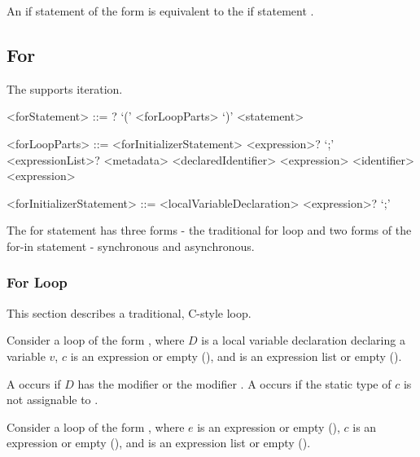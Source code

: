 \documentclass[makeidx]{article}
\begin{document}
{\LMHash{}%
An if statement of the form  is equivalent to
the if statement .


\subsection{For}

\LMHash{}%
The  supports iteration.

\begin{grammar}
<forStatement> ::= \AWAIT? \FOR{} `(' <forLoopParts> `)' <statement>

<forLoopParts> ::= <forInitializerStatement> <expression>? `;' <expressionList>?
  \alt <metadata> <declaredIdentifier> \IN{} <expression>
  \alt <identifier> \IN{} <expression>

<forInitializerStatement> ::= <localVariableDeclaration>
  \alt <expression>? `;'
\end{grammar}

\LMHash{}%
The for statement has three forms - the traditional for loop
and two forms of the for-in statement - synchronous and asynchronous.


\subsubsection{For Loop}

\LMHash{}%
This section describes a traditional, C-style \FOR{} loop.

\LMHash{}%
Consider a loop of the form
,
where $D$ is a local variable declaration declaring a variable $v$,
$c$ is an expression or empty
(),
and  is an expression list or empty
().

\LMHash{}%
A  occurs if $D$ has
the modifier \CONST{} or the modifier \LATE.
A  occurs if the static type of $c$ is not
assignable to .

\LMHash{}%
Consider a loop of the form
,
where $e$ is an expression or empty
(),
$c$ is an expression or empty
(),
and  is an expression list or empty
().

}
\end{document}
